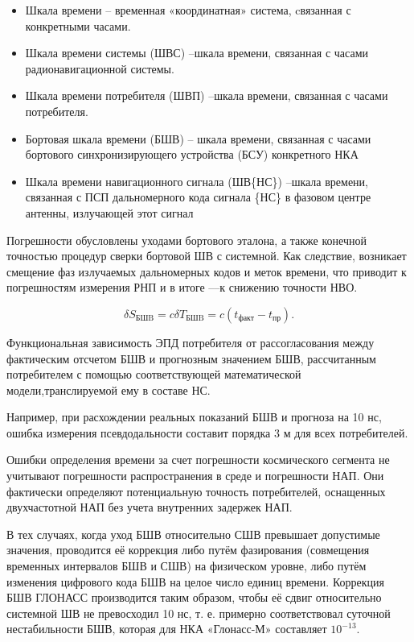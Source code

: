 \documentclass[14pt,a4paper,oneside]{extarticle}
\begin{document}
\begin{itemize}
    \item Шкала времени – временная «координатная» система, cвязанная с конкретными часами.
    \item Шкала времени системы (ШВС) –шкала времени, связанная с часами радионавигационной системы.
    \item Шкала времени потребителя (ШВП) –шкала времени,  связанная с часами потребителя.
    \item Бортовая шкала времени (БШВ)  – шкала времени, связанная с часами бортового синхронизирующего устройства (БСУ) конкретного НКА
    \item Шкала времени навигационного сигнала (ШВ\{НС\}) –шкала времени, связанная с ПСП дальномерного кода сигнала \{НС\} в фазовом центре антенны, излучающей этот сигнал
\end{itemize}

Погрешности обусловлены уходами бортового эталона, а также конечной точностью процедур сверки бортовой ШВ с системной. Как следствие, возникает смещение фаз излучаемых дальномерных кодов и меток времени, что приводит к погрешностям измерения РНП и в итоге ––к снижению точности НВО.

\[\delta S_{\text{БШB}}=c\delta T_{\text{БШB}}=c\left(t_\text{факт}-t_\text{{пр}}\right).\]

Функциональная зависимость ЭПД потребителя от рассогласования между фактическим отсчетом БШВ и прогнозным значением БШВ, рассчитанным потребителем с помощью соответствующей математической модели,транслируемой ему в составе НС.

Например, при расхождении реальных показаний БШВ и прогноза на 10 нс, ошибка измерения псевдодальности составит порядка 3 м для всех потребителей.

Ошибки определения времени за счет погрешности космического сегмента не учитывают погрешности распространения в среде и погрешности НАП. Они фактически определяют потенциальную точность потребителей, оснащенных двухчастотной НАП без учета внутренних задержек НАП.

В тех случаях, когда уход БШВ относительно СШВ превышает допустимые значения, проводится её коррекция либо путём фазирования (совмещения временных интервалов БШВ и СШВ) на физическом уровне, либо путём изменения цифрового кода БШВ на целое число единиц времени. Коррекция БШВ ГЛОНАСС производится таким образом, чтобы её сдвиг относительно системной ШВ не превосходил 10 нс, т. е. примерно соответствовал суточной нестабильности БШВ, которая для НКА «Глонасс-М» составляет $10^{-13}$.
\end{document}
